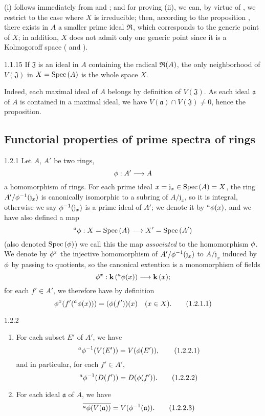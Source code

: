 (i) follows immediately from  and ; and for
proving (ii), we can, by virtue of , we restrict to the case where
$X$ is irreducible; then, according to the proposition , there exists
in $A$ a smaller prime ideal $\mathfrak{R}$, which corresponds to the generic point
of $X$; in addition, $X$ does not admit only one generic point since it is a Kolmogoroff
space ( and ).

\begin{envs}[Proposition]{1.1.15}
\label{prop-1.1.1.15}
If $\mathfrak{J}$ is an ideal in $A$ containing the radical $\mathfrak{R}(A)$, the only
neighborhood of $V(\mathfrak{J})$ in $X={\mathop{\mathrm{Spec}}\nolimits}\,(A)$ is the whole space $X$.
\end{envs}

Indeed, each maximal ideal of $A$ belongs by definition of $V(\mathfrak{J})$.
As each ideal $\mathfrak{a}$ of $A$ is contained in a maximal ideal, we have
$V(\mathfrak{a})\cap V(\mathfrak{J})\neq 0$, hence the proposition.

\subsection{Functorial properties of prime spectra of rings}
\label{1-schemes-1.2}       

\begin{env}{1.2.1}
\label{env-1.1.2.1}
Let $A$, $A'$ be two rings,
\[
  \phi:A'\longrightarrow A
\]
a homomorphism of rings. For each prime ideal $x=\mathfrak{j}_x\in{\mathop{\mathrm{Spec}}\nolimits}\,(A)=X$, the
ring $A'/\phi^{-1}(\mathfrak{j}_x)$ is canonically isomorphic to a subring of
$A/\mathfrak{j}_x$, so it is integral, otherwise we say
$\phi^{-1}(\mathfrak{j}_x)$ is a prime ideal of $A'$; we denote it by
$^a\phi(x)$, and we have also defined a map
\[
  ^a\phi:X={\mathop{\mathrm{Spec}}\nolimits}\,(A)\longrightarrow X'={\mathop{\mathrm{Spec}}\nolimits}\,(A')
\]
(also denoted ${\mathop{\mathrm{Spec}}\nolimits}\,(\phi)$) we call this the map \emph{associated} to the
homomorphism $\phi$. We denote by $\phi^x$ the injective homomorphism of
$A'/\phi^{-1}(\mathfrak{j}_x)$ to $A/\mathfrak{j}_x$ induced by $\phi$ by
passing to quotients, so the canonical extention is a monomorphism of fields
\[
  \phi^x:\mathbf{k}\,(^a\phi(x))\longrightarrow\mathbf{k}\,(x);
\]
for each $f'\in A'$, we therefore have by definition
\[
  \phi^x(f'(^a\phi(x)))=(\phi(f'))(x)\quad(x\in X).
  \tag{1.2.1.1}
\]
\end{env}

\begin{envs}[Proposition]{1.2.2}
\label{prop-1.1.2.2}
\begin{enumerate}[label=\rm{(\roman*)}]
  \item For each subset $E'$ of $A'$, we have
        \[
          ^a\phi^{-1}(V(E'))=V(\phi(E')),
          \tag{1.2.2.1}
        \]
        and in particular, for each $f'\in A'$,
        \[
          ^a\phi^{-1}(D(f'))=D(\phi(f')).
          \tag{1.2.2.2}
        \]
  \item For each ideal $\mathfrak{a}$ of $A$, we have
        \[
          \overline{^a\phi(V(\mathfrak{a}))}=V(\phi^{-1}(\mathfrak{a})).
          \tag{1.2.2.3}
        \]
\end{enumerate}
\end{envs}

